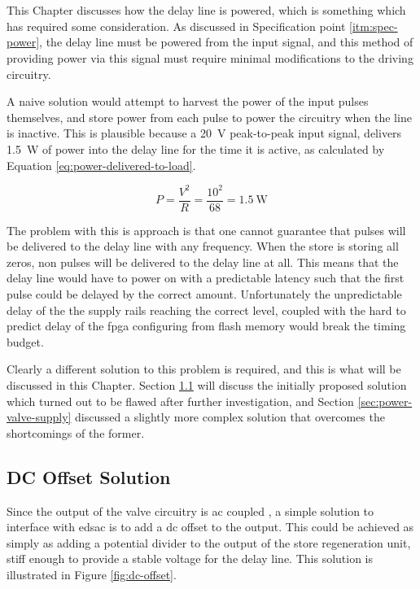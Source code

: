 \chapter{} \label{sec:power}

This Chapter discusses how the delay line is powered, which is something which has required some consideration. As discussed in Specification point \ref{itm:spec-power}, the delay line must be powered from the input signal, and this method of providing power via this signal must require minimal modifications to the driving circuitry.

A naive solution would attempt to harvest the power of the input pulses themselves, and store power from each pulse to power the circuitry when the line is inactive. This is plausible because a \SI{20}{\volt} peak-to-peak input signal, delivers \SI{1.5}{\watt} of power into the delay line for the time it is active, as calculated by Equation \ref{eq:power-delivered-to-load}.

\begin{equation}
P = \frac{V^2}{R} = \frac{10^2}{68} = \SI{1.5}{\watt} \label{eq:power-delivered-to-load}
\end{equation}

The problem with this is approach is that one cannot guarantee that pulses will be delivered to the delay line with any frequency. When the store is storing all zeros, non pulses will be delivered to the delay line at all. This means that the delay line would have to power on with a predictable latency such that the first pulse could be delayed by the correct amount. Unfortunately the unpredictable delay of the the supply rails reaching the correct level, coupled with the hard to predict delay of the \gls{fpga} configuring from flash memory would break the timing budget.

Clearly a different solution to this problem is required, and this is what will be discussed in this Chapter. Section \ref{sec:power-dc-offset} will discuss the initially proposed solution which turned out to be flawed after further investigation, and Section \ref{sec:power-valve-supply} discussed a slightly more complex solution that overcomes the shortcomings of the former.



\section{DC Offset Solution} \label{sec:power-dc-offset}
Since the output of the valve circuitry is \gls{ac} coupled , a simple solution to interface with \gls{edsac} is to add a \gls{dc} offset to the output. This could be achieved as simply as adding a potential divider to the output of the store regeneration unit, stiff enough to provide a stable voltage for the delay line. This solution is illustrated in Figure \ref{fig:dc-offset}.

